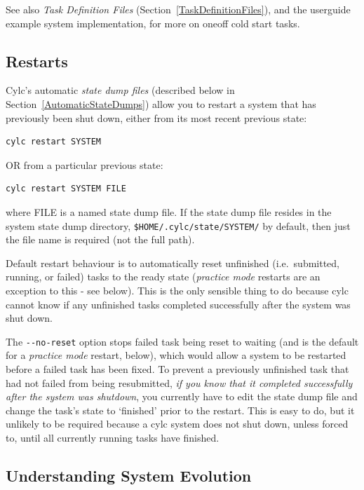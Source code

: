 \documentclass[11pt,a4paper]{article}
\begin{document}
See also {\em Task Definition Files}
(Section~\ref{TaskDefinitionFiles}), and the userguide example system
implementation, for more on oneoff cold start tasks.

\subsection{Restarts}
\label{Restarts}

Cylc's automatic {\em state dump files} (described below in
Section~\ref{AutomaticStateDumps}) allow you to restart a system
that has previously been shut down, either from 
its most recent previous state:

\begin{lstlisting}
cylc restart SYSTEM
\end{lstlisting}

OR from a particular previous state:

\begin{lstlisting}
cylc restart SYSTEM FILE
\end{lstlisting}

where FILE is a named state dump file. If the state dump file resides in
the system state dump directory,  
\lstinline=$HOME/.cylc/state/SYSTEM/= by default, then just the file
name is required (not the full path).

Default restart behaviour is to automatically reset unfinished (i.e.\
submitted, running, or failed) tasks to the ready state ({\em practice
mode} restarts are an exception to this - see below).  This is the only
sensible thing to do because cylc cannot know if any unfinished tasks
completed successfully after the system was shut down.  

The \lstinline=--no-reset= option stops failed task being reset to 
waiting (and is the default for a {\em practice mode} restart, below), 
which would allow a system to be restarted before a failed task has been
fixed. To prevent a previously unfinished task that had not failed from
being resubmitted, {\em if you know that it completed successfully after
the system was shutdown}, you currently have to edit the state dump file
and change the task's state to `finished' prior to the restart. This is
easy to do, but it unlikely to be required because a cylc system does
not shut down, unless forced to, until all currently running tasks have
finished.


\subsection{Understanding System Evolution}
\label{UnderstandingSystemEvolution}
\end{document}
